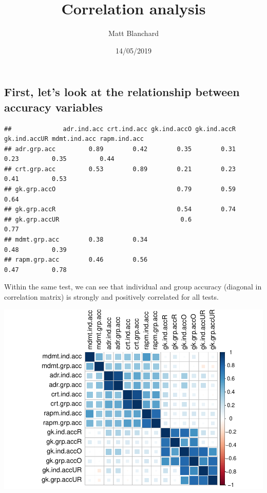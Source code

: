 \documentclass[]{article}
\title{Correlation analysis}
\author{Matt Blanchard}
\date{14/05/2019}
\begin{document}
\maketitle

\subsection{First, let's look at the relationship between accuracy
variables}\label{first-lets-look-at-the-relationship-between-accuracy-variables}

\begin{verbatim}
##              adr.ind.acc crt.ind.acc gk.ind.accO gk.ind.accR gk.ind.accUR mdmt.ind.acc rapm.ind.acc
## adr.grp.acc         0.89        0.42        0.35        0.31         0.23         0.35         0.44
## crt.grp.acc         0.53        0.89        0.21        0.23                      0.41         0.53
## gk.grp.accO                                 0.79        0.59         0.64                          
## gk.grp.accR                                 0.54        0.74                                       
## gk.grp.accUR                                 0.6                     0.77                          
## mdmt.grp.acc        0.38        0.34                                              0.48         0.39
## rapm.grp.acc        0.46        0.56                                              0.47         0.78
\end{verbatim}

Within the same test, we can see that individual and group accuracy
(diagonal in correlation matrix) is strongly and positively correlated
for all tests.

\includegraphics{corr_analyses_files/figure-latex/accuracy2-1.pdf}
\end{document}
